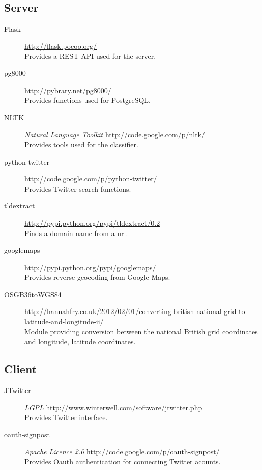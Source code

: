 \subsection{Server}

\begin{description}
    \item[Flask] \url{http://flask.pocoo.org/} \hfill \\
        Provides a REST API used for the server.
    \item[pg8000] \url{http://pybrary.net/pg8000/} \hfill \\
        Provides functions used for PostgreSQL.
    \item[NLTK] \emph{Natural Language Toolkit} \url{http://code.google.com/p/nltk/} \hfill \\
        Provides tools used for the classifier.
    \item[python-twitter] \url{http://code.google.com/p/python-twitter/} \hfill \\
        Provides Twitter search functions.
    \item[tldextract] \url{http://pypi.python.org/pypi/tldextract/0.2} \hfill \\
        Finds a domain name from a url.
    \item[googlemaps] \url{http://pypi.python.org/pypi/googlemaps/} \hfill \\
        Provides reverse geocoding from Google Maps.
    \item[OSGB36toWGS84] \url{http://hannahfry.co.uk/2012/02/01/converting-british-national-grid-to-latitude-and-longitude-ii/} \hfill \\
        Module providing conversion between the national British grid coordinates and longitude, latitude coordinates.
\end{description}

\subsection{Client}

\begin{description}
    \item[JTwitter] \emph{LGPL} \url{http://www.winterwell.com/software/jtwitter.php} \hfill \\
        Provides Twitter interface.
    \item[oauth-signpost] \emph{Apache Licence 2.0} \url{http://code.google.com/p/oauth-signpost/} \hfill \\
        Provides Oauth authentication for connecting Twitter acounts.
\end{description}
